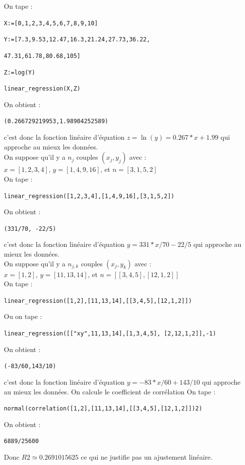 \documentclass[a4paper,11pt]{book}
\begin{document}
On tape :
\begin{center}{\tt X:=[0,1,2,3,4,5,6,7,8,9,10]}\end{center}
\begin{center}{\tt Y:=[7.3,9.53,12.47,16.3,21.24,27.73,36.22,}\end{center}
\begin{center}{\tt 47.31,61.78,80.68,105]}\end{center}
\begin{center}{\tt Z:=log(Y)}\end{center}
\begin{center}{\tt linear\_regression(X,Z)}\end{center}
On obtient :
\begin{center}{\tt (0.266729219953,1.98904252589)}\end{center}
c'est donc la fonction lin\'eaire d'\'equation $z=\ln(y)=0.267*x+1.99$ 
qui approche au mieux les donn\'ees.\\

On suppose qu'il y a $n_j$ couples $(x_j,y_j)$  avec :\\
$x=[1,2,3,4]$, $y=[1,4,9,16]$, et $n=[3,1,5,2]$\\
On tape :
\begin{center}{\tt linear\_regression([1,2,3,4],[1,4,9,16],[3,1,5,2])}\end{center}
On obtient :
\begin{center}{\tt (331/70, -22/5)}\end{center}
c'est donc la fonction lin\'eaire d'\'equation $y=331*x/70-22/5$ 
qui approche au mieux les donn\'ees.\\

On suppose qu'il y a $n_{j,k}$ couples $(x_j,y_k)$  avec :\\
$x=[1,2]$, $y=[11,13,14]$, et $n=[[3,4,5],[12,1,2]]$\\
On tape :
\begin{center}{\tt linear\_regression([1,2],[11,13,14],[[3,4,5],[12,1,2]])}\end{center}
Ou on tape :
\begin{center}{\tt linear\_regression([["xy",11,13,14],[1,3,4,5], [2,12,1,2]],-1)}\end{center}
On obtient :
\begin{center}{\tt (-83/60,143/10)}\end{center}
c'est donc la fonction lin\'eaire d'\'equation $y=-83*x/60+143/10$ 
qui approche au mieux les donn\'ees.
On calcule le coefficient de corr\'elation
On tape :
\begin{center}{\tt normal(correlation([1,2],[11,13,14],[[3,4,5],[12,1,2]])\verb|2|)}\end{center}
On obtient :
\begin{center}{\tt 6889/25600}\end{center}
Donc $R2 \simeq 0.2691015625$ ce qui ne justifie pas un ajustement lin\'eaire.
\end{document}
